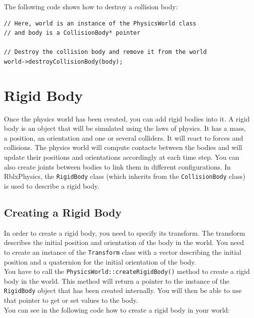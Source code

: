 \documentclass[a4paper,12pt]{article}
\begin{document}
    The following code shows how to destroy a collision body: \\

    \begin{lstlisting}
// Here, world is an instance of the PhysicsWorld class
// and body is a CollisionBody* pointer

// Destroy the collision body and remove it from the world
world->destroyCollisionBody(body);
  \end{lstlisting}

    \section{Rigid Body}
    \label{sec:rigidbody}

    Once the physics world has been created, you can add rigid bodies into it. A rigid body is an object that will be simulated using the laws of physics.
    It has a mass, a position, an orientation and one or several colliders. It will react to forces and collisions. The physics world will compute contacts
    between the bodies and will update their positions and orientations accordingly at each time step. You can also create joints between bodies to link
    them in different configurations. In RblxPhysics, the \texttt{RigidBody} class (which inherits from the \texttt{CollisionBody} class) is used to
    describe a rigid body.

    \subsection{Creating a Rigid Body}

    In order to create a rigid body, you need to specify its transform. The transform describes the initial
    position and orientation of the body in the world. You need to create an instance of the \texttt{Transform} class with a vector describing the
    initial position and a quaternion for the initial orientation of the body. \\

    You have to call the \texttt{PhysicsWorld::createRigidBody()} method to create a rigid body in the world. This method will return a pointer to the
    instance of the \texttt{RigidBody} object that has been created internally. You will then be able to use that pointer to get or set values to the body. \\

    You can see in the following code how to create a rigid body in your world: \\
\end{document}
